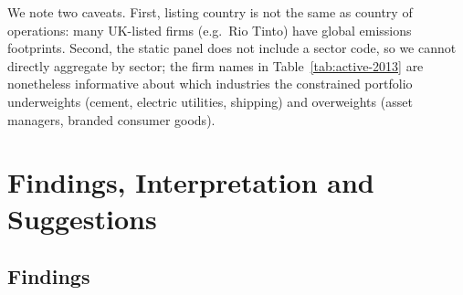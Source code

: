 \documentclass[11pt,a4paper]{article}
\begin{document}

We note two caveats. First, listing country is not the same as
country of operations: many UK-listed firms (e.g.\ Rio Tinto) have
global emissions footprints. Second, the static panel does not
include a sector code, so we cannot directly aggregate by sector;
the firm names in Table~\ref{tab:active-2013} are nonetheless
informative about which industries the constrained portfolio
underweights (cement, electric utilities, shipping) and overweights
(asset managers, branded consumer goods).

\section{Findings, Interpretation and Suggestions}\label{sec:findings}

\subsection{Findings}
\end{document}
